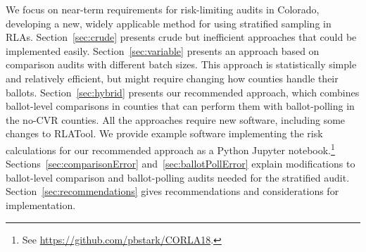 \documentclass[runningheads]{llncs}
\begin{document}
We focus on near-term requirements for risk-limiting audits in Colorado,
developing a new, widely applicable method for using stratified sampling in RLAs.
Section~\ref{sec:crude} presents crude but inefficient approaches
that could be implemented easily.
Section~\ref{sec:variable}
presents an approach based on comparison audits with different batch sizes.
This approach is statistically simple and relatively efficient, but might require changing how counties
handle their ballots.
Section~\ref{sec:hybrid} presents our recommended approach, which combines ballot-level
comparisons in counties that can perform them with ballot-polling in the no-CVR counties.
All the approaches require new software, including some changes to RLATool.
We provide example software implementing the risk calculations for
our recommended approach as a Python Jupyter notebook.\footnote{%
 See \url{https://github.com/pbstark/CORLA18}.
}
Sections~\ref{sec:comparisonError} and~\ref{sec:ballotPollError} explain
modifications to ballot-level comparison and ballot-polling audits needed for the stratified audit. 
Section~\ref{sec:recommendations} gives recommendations and
considerations for implementation.
\end{document}
